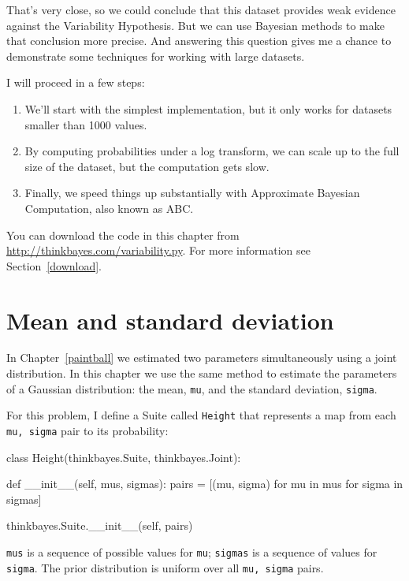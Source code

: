 \documentclass[12pt]{book}
\theoremstyle{exercise}
\begin{document}
That's very close, so we could conclude that this dataset provides
weak evidence against the Variability Hypothesis.  But we can use
Bayesian methods to make that conclusion more precise.  And answering
this question gives me a chance to demonstrate some techniques
for working with large datasets.

I will proceed in a few steps:

\begin{enumerate}

\item We'll start with the simplest implementation, but it only works
  for datasets smaller than 1000 values.

\item By computing probabilities under a log transform, we can scale
  up to the full size of the dataset, but the computation gets slow.

\item Finally, we speed things up substantially with Approximate
  Bayesian Computation, also known as ABC.

\end{enumerate}

You can download the code in this chapter from
\url{http://thinkbayes.com/variability.py}.
  For more information
see Section~\ref{download}.

\section{Mean and standard deviation}

In Chapter~\ref{paintball} we estimated two parameters simultaneously
using a joint distribution.  In this chapter we use the same
method to estimate the parameters of a Gaussian distribution:
the mean, {\tt mu}, and the standard deviation, {\tt sigma}.

For this problem, I define a Suite called {\tt Height} that
represents a map from each {\tt mu, sigma} pair to its probability:

\begin{code}
class Height(thinkbayes.Suite, thinkbayes.Joint):

    def __init__(self, mus, sigmas):
        pairs = [(mu, sigma) 
                 for mu in mus
                 for sigma in sigmas]

        thinkbayes.Suite.__init__(self, pairs)
\end{code}

{\tt mus} is a sequence of possible values for {\tt mu}; {\tt sigmas}
is a sequence of values for {\tt sigma}.  The prior distribution
is uniform over all {\tt mu, sigma} pairs.
\end{document}
